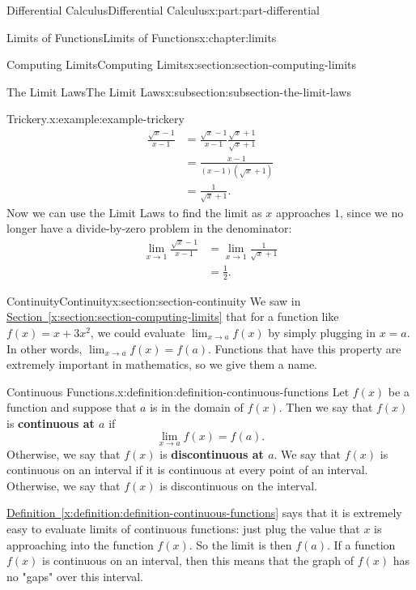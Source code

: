\documentclass[twoside,10pt,]{tufte-book}
\newcommand{\xreffont}{\relax}
\newcommand{\terminology}[1]{\textbf{#1}}
\numberwithin{equation}{part}
\begin{document}
\begin{partptx}{Differential Calculus}{}{Differential Calculus}{}{}{x:part:part-differential}
\begin{chapterptx}{Limits of Functions}{}{Limits of Functions}{}{}{x:chapter:limits}
\begin{sectionptx}{Computing Limits}{}{Computing Limits}{}{}{x:section:section-computing-limits}
\begin{subsectionptx}{The Limit Laws}{}{The Limit Laws}{}{}{x:subsection:subsection-the-limit-laws}
\begin{example}{Trickery.}{x:example:example-trickery}
%
\begin{align*}
\frac{\sqrt{x}-1}{x-1} & = \frac{\sqrt{x}-1}{x-1}\frac{\sqrt{x}+1}{\sqrt{x}+1} \\
& = \frac{x - 1}{(x-1)(\sqrt{x}+1)} \\
& = \frac{1}{\sqrt{x}+1}. 
\end{align*}
Now we can use the Limit Laws to find the limit as \(x\) approaches \(1\), since we no longer have a divide-by-zero problem in the denominator:%
%
\begin{align*}
\lim_{x\to1}\frac{\sqrt{x}-1}{x-1} & = \lim_{x\to1}\frac{1}{\sqrt{x}+1} \\
& = \frac{1}{2}. 
\end{align*}
\end{example}
\end{subsectionptx}
\end{sectionptx}
%
%
\typeout{************************************************}
\typeout{************************************************}
%
\begin{sectionptx}{Continuity}{}{Continuity}{}{}{x:section:section-continuity}
We saw in \hyperref[x:section:section-computing-limits]{Section~{\xreffont\ref{x:section:section-computing-limits}}} that for a function like \(f(x) = x+3x^{2}\), we could evaluate \(\lim_{x\to a}f(x)\) by simply plugging in \(x=a\). In other words, \(\lim_{x\to a}f(x) = f(a)\). Functions that have this property are extremely important in mathematics, so we give them a name.%
\begin{definition}{Continuous Functions.}{x:definition:definition-continuous-functions}%
%
Let \(f(x)\) be a function and suppose that \(a\) is in the domain of \(f(x)\). Then we say that \(f(x)\) is \terminology{continuous at \(a\)} if%
\begin{equation*}
\lim_{x\to a}f(x) = f(a)\text{.}
\end{equation*}
Otherwise, we say that \(f(x)\) is \terminology{discontinuous at \(a\)}. We say that \(f(x)\) is continuous on an interval if it is continuous at every point of an interval. Otherwise, we say that \(f(x)\) is discontinuous on the interval.%
\end{definition}
\hyperref[x:definition:definition-continuous-functions]{Definition~{\xreffont\ref{x:definition:definition-continuous-functions}}} says that it is extremely easy to evaluate limits of continuous functions: just plug the value that \(x\) is approaching into the function \(f(x)\). So the limit is then \(f(a)\). If a function \(f(x)\) is continuous on an interval, then this means that the graph of \(f(x)\) has no "gaps" over this interval.%

\end{sectionptx}
\end{chapterptx}
\end{partptx}
\end{document}
